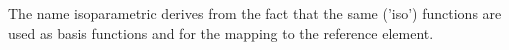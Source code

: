 
The name isoparametric derives from the fact that the same ('iso') 
functions are used as basis functions and for the mapping to the reference element. 
